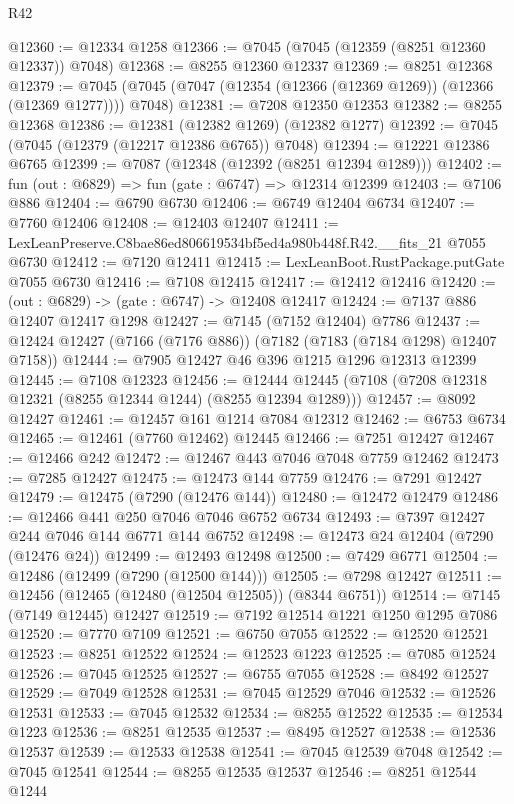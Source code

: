 \begin{lexlean}{R42}
\begin{coremodule}
{@12360 := @12334 @1258
@12366 := @7045 (@7045 (@12359 (@8251 @12360 @12337)) @7048)
@12368 := @8255 @12360 @12337
@12369 := @8251 @12368
@12379 := @7045 (@7045 (@7047 (@12354 (@12366 (@12369 @1269)) (@12366 (@12369 @1277)))) @7048)
@12381 := @7208 @12350 @12353
@12382 := @8255 @12368
@12386 := @12381 (@12382 @1269) (@12382 @1277)
@12392 := @7045 (@7045 (@12379 (@12217 @12386 @6765)) @7048)
@12394 := @12221 @12386 @6765
@12399 := @7087 (@12348 (@12392 (@8251 @12394 @1289)))
@12402 := fun (out : @6829) => fun (gate : @6747) => @12314 @12399
@12403 := @7106 @886
@12404 := @6790 @6730
@12406 := @6749 @12404 @6734
@12407 := @7760 @12406
@12408 := @12403 @12407
@12411 := LexLeanPreserve.C8bae86ed806619534bf5ed4a980b448f.R42.__fits_21 @7055 @6730
@12412 := @7120 @12411
@12415 := LexLeanBoot.RustPackage.putGate @7055 @6730
@12416 := @7108 @12415
@12417 := @12412 @12416
@12420 := (out : @6829) -> (gate : @6747) -> @12408 @12417
@12424 := @7137 @886 @12407 @12417 @1298
@12427 := @7145 (@7152 @12404) @7786
@12437 := @12424 @12427 (@7166 (@7176 @886)) (@7182 (@7183 (@7184 @1298) @12407 @7158))
@12444 := @7905 @12427 @46 @396 @1215 @1296 @12313 @12399
@12445 := @7108 @12323
@12456 := @12444 @12445 (@7108 (@7208 @12318 @12321 (@8255 @12344 @1244) (@8255 @12394 @1289)))
@12457 := @8092 @12427
@12461 := @12457 @161 @1214 @7084 @12312
@12462 := @6753 @6734
@12465 := @12461 (@7760 @12462) @12445
@12466 := @7251 @12427
@12467 := @12466 @242
@12472 := @12467 @443 @7046 @7048 @7759 @12462
@12473 := @7285 @12427
@12475 := @12473 @144 @7759
@12476 := @7291 @12427
@12479 := @12475 (@7290 (@12476 @144))
@12480 := @12472 @12479
@12486 := @12466 @441 @250 @7046 @7046 @6752 @6734
@12493 := @7397 @12427 @244 @7046 @144 @6771 @144 @6752
@12498 := @12473 @24 @12404 (@7290 (@12476 @24))
@12499 := @12493 @12498
@12500 := @7429 @6771
@12504 := @12486 (@12499 (@7290 (@12500 @144)))
@12505 := @7298 @12427
@12511 := @12456 (@12465 (@12480 (@12504 @12505)) (@8344 @6751))
@12514 := @7145 (@7149 @12445) @12427
@12519 := @7192 @12514 @1221 @1250 @1295 @7086
@12520 := @7770 @7109
@12521 := @6750 @7055
@12522 := @12520 @12521
@12523 := @8251 @12522
@12524 := @12523 @1223
@12525 := @7085 @12524
@12526 := @7045 @12525
@12527 := @6755 @7055
@12528 := @8492 @12527
@12529 := @7049 @12528
@12531 := @7045 @12529 @7046
@12532 := @12526 @12531
@12533 := @7045 @12532
@12534 := @8255 @12522
@12535 := @12534 @1223
@12536 := @8251 @12535
@12537 := @8495 @12527
@12538 := @12536 @12537
@12539 := @12533 @12538
@12541 := @7045 @12539 @7048
@12542 := @7045 @12541
@12544 := @8255 @12535 @12537
@12546 := @8251 @12544 @1244
}
\end{coremodule}
\end{lexlean}
